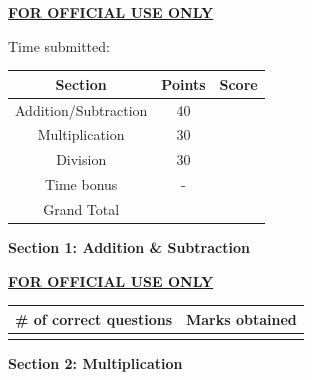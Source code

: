 \documentclass[11pt]{article}
\begin{document}
\vspace{0.45in}
\begin{center}
\underline{\large\textbf{FOR OFFICIAL USE ONLY}}

\vspace{0.15in}
Time submitted: \underline{\hspace{5cm}}
\end{center}
\begin{table}[h]
\centering
\begin{tabular}{|c|c|c|}
    \hline
    Section & Points & Score \\
    \hline
    Addition/Subtraction & 40 & \\
    \hline
    Multiplication & 30 & \\
    \hline
    Division & 30 & \\
    \hline
    Time bonus & - &  \\
    \hline
    Grand Total & & \\
    \hline
\end{tabular}
\end{table}


\clearpage
\vspace{0.2 in}
\begin{center}
{\bf \Large{Section 1: Addition \& Subtraction}}
\end{center}
\vspace{0.1in}



\clearpage
\vspace{0.2 in}



\begin{center}
\vspace{0.4in}
\underline{\large\textbf{FOR OFFICIAL USE ONLY}}

\begin{table}[h]
\centering
\begin{tabular}{|c|c|}
    \hline \# of correct questions & Marks obtained \\
    \hline  &  \\ [3ex]
    \hline
\end{tabular}
\end{table}
\end{center}


\clearpage
\vspace{0.2 in}
\begin{center}
{\bf \Large{Section 2: Multiplication}}
\end{center}
\vspace{0.1in}
\end{document}
